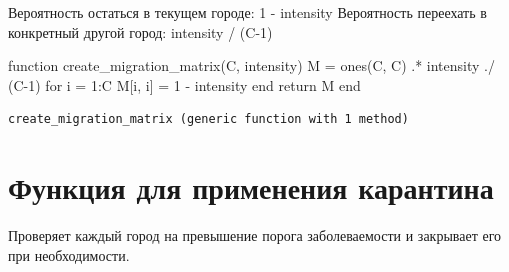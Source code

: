 \documentclass[
  12pt,
  a4paper,
  DIV=11,
  numbers=noendperiod]{scrreprt}
\newenvironment{Shaded}{\begin{snugshade}}{\end{snugshade}}
\newcommand{\ControlFlowTok}[1]{\textcolor[rgb]{0.00,0.23,0.31}{#1}}
\newcommand{\FloatTok}[1]{\textcolor[rgb]{0.68,0.00,0.00}{#1}}
\newcommand{\FunctionTok}[1]{\textcolor[rgb]{0.28,0.35,0.67}{#1}}
\newcommand{\KeywordTok}[1]{\textcolor[rgb]{0.00,0.23,0.31}{#1}}
\newcommand{\NormalTok}[1]{\textcolor[rgb]{0.00,0.23,0.31}{#1}}
\newcommand{\OperatorTok}[1]{\textcolor[rgb]{0.37,0.37,0.37}{#1}}
\begin{document}
Вероятность остаться в текущем городе: 1 - intensity Вероятность
переехать в конкретный другой город: intensity / (C-1)

\begin{Shaded}
\begin{Highlighting}[]
\KeywordTok{function} \FunctionTok{create\_migration\_matrix}\NormalTok{(C, intensity)}
\NormalTok{    M }\OperatorTok{=} \FunctionTok{ones}\NormalTok{(C, C) }\OperatorTok{.*}\NormalTok{ intensity }\OperatorTok{./}\NormalTok{ (C}\OperatorTok{{-}}\FloatTok{1}\NormalTok{)}
    \ControlFlowTok{for}\NormalTok{ i }\OperatorTok{=} \FloatTok{1}\OperatorTok{:}\NormalTok{C}
\NormalTok{        M[i, i] }\OperatorTok{=} \FloatTok{1} \OperatorTok{{-}}\NormalTok{ intensity}
    \ControlFlowTok{end}
    \ControlFlowTok{return}\NormalTok{ M}
\KeywordTok{end}
\end{Highlighting}
\end{Shaded}

\begin{verbatim}
create_migration_matrix (generic function with 1 method)
\end{verbatim}

\section{Функция для применения
карантина}\label{ux444ux443ux43dux43aux446ux438ux44f-ux434ux43bux44f-ux43fux440ux438ux43cux435ux43dux435ux43dux438ux44f-ux43aux430ux440ux430ux43dux442ux438ux43dux430}

Проверяет каждый город на превышение порога заболеваемости и закрывает
его при необходимости.
\end{document}

